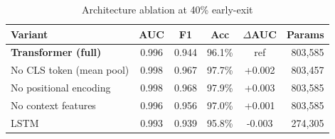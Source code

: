 \begin{table}[h]
\centering
\caption{Architecture ablation at 40\% early-exit}
\label{tab:arch_ablation}
\begin{tabular}{lccccr}
\toprule
Variant & AUC & F1 & Acc & $\Delta$AUC & Params \\
\midrule
\textbf{Transformer (full)} & 0.996 & 0.944 & 96.1\% & ref & 803,585 \\
No CLS token (mean pool) & 0.998 & 0.967 & 97.7\% & +0.002 & 803,457 \\
No positional encoding & 0.998 & 0.968 & 97.9\% & +0.003 & 803,585 \\
No context features & 0.996 & 0.956 & 97.0\% & +0.001 & 803,585 \\
LSTM & 0.993 & 0.939 & 95.8\% & -0.003 & 274,305 \\
\bottomrule
\end{tabular}
\end{table}